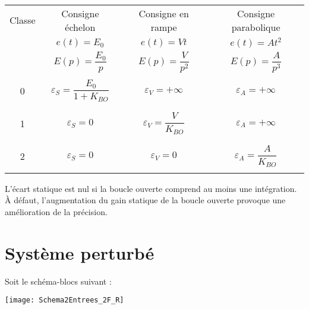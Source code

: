 \begin{resultat} ~\\

\begin{center}
\begin{tabular}{|c|c|c|c|}
\hline 
Classe & Consigne échelon & Consigne en rampe & Consigne parabolique \\
& $e(t)=E_0$ & $e(t)=V t $ & $e(t)=At^2$ \\ 
& $E(p)=\dfrac{E_0}{p}$ & $E(p)=\dfrac{V}{p^2}$ & $E(p)=\dfrac{A}{p^3}$ \\ 
\hline \hline 
&&&\\
0 & $\varepsilon_S = \dfrac{E_0}{1+K_{BO}} $ & $\varepsilon_V = +\infty$ & $\varepsilon_A = +\infty$ \\
&&&\\
\hline 
&&&\\
1 & $\varepsilon_S = 0$ & $\varepsilon_V = \dfrac{V}{K_{BO}} $ & $\varepsilon_A = +\infty$ \\
&&&\\
\hline 
&&&\\
2 & $\varepsilon_S = 0 $ & $\varepsilon_V = 0$ & $\varepsilon_A = \dfrac{A}{K_{BO}}$ \\
&&&\\
\hline 
\end{tabular}
\end{center}

\begin{rem}
L'écart statique est nul si la boucle ouverte comprend au moins une intégration. À défaut, l'augmentation du gain statique de la boucle ouverte provoque une amélioration de la précision.
\end{rem}

\end{resultat}




%

%
%

\section{Système perturbé}
Soit le schéma-blocs suivant : 
\begin{center}
%
\texttt{[image: Schema2Entrees\_2F\_R]}
\end{center}

